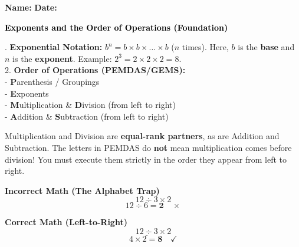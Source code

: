 \documentclass[12pt, letterpaper, fleqn]{article}
\begin{document}
\textbf{Name:} \underline{\hspace{5cm}}
\hfill
\textbf{Date:} \underline{\hspace{3cm}}\\

\begin{tcolorbox}[colback=black!10]
    \large\textcolor{black}{\textbf{Exponents and the Order of Operations (Foundation)}}
\end{tcolorbox}

\vspace{3mm}

. \textbf{Exponential Notation:} $b^n = b \times b \times \dots \times b$ ($n$ times). Here, $b$ is the \textbf{base} and $n$ is the \textbf{exponent}. Example: $2^3 = 2 \times 2 \times 2 = 8$. \\
2. \textbf{Order of Operations (PEMDAS/GEMS):} \\
- \textbf{P}arenthesis / Groupings \\
- \textbf{E}xponents \\
- \textbf{M}ultiplication \& \textbf{D}ivision (from left to right) \\
- \textbf{A}ddition \& \textbf{S}ubtraction (from left to right)

\vspace{4mm}

\begin{tcolorbox}[colback=yellow!5, colframe=orange!70!black, boxrule=0.8pt, title=\textbf{CRITICAL WARNING: The Left-to-Right Tie Breaker}]
\small
Multiplication and Division are \textbf{equal-rank partners}, as are Addition and Subtraction. The letters in PEMDAS do \textbf{not} mean multiplication comes before division! You must execute them strictly in the order they appear from left to right.

\medskip
\begin{minipage}{0.48\textwidth}
\centering
\textbf{\color{red}Incorrect Math (The Alphabet Trap)}
$$12 \div 3 \times 2$$
$$12 \div 6 = \mathbf{2} \quad \times$$
\end{minipage}
\begin{minipage}{0.48\textwidth}
\centering
\textbf{\color{green!60!black}Correct Math (Left-to-Right)}
$$\underline{12 \div 3} \times 2$$
$$4 \times 2 = \mathbf{8} \quad \checkmark$$
\end{minipage}
\end{tcolorbox}
\end{document}
